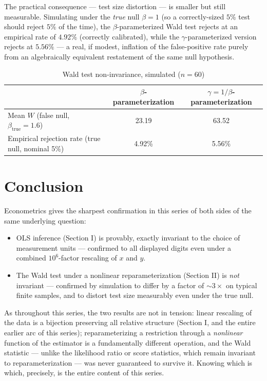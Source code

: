 \documentclass[10pt,journal,compsoc]{IEEEtran}
\begin{document}
The practical consequence — test size distortion — is smaller but still measurable. Simulating under the \emph{true} null $\beta=1$ (so a correctly-sized $5\%$ test should reject $5\%$ of the time), the $\beta$-parameterized Wald test rejects at an empirical rate of $4.92\%$ (correctly calibrated), while the $\gamma$-parameterized version rejects at $5.56\%$ — a real, if modest, inflation of the false-positive rate purely from an algebraically equivalent restatement of the same null hypothesis.

\begin{table}[h]
\centering
\caption{Wald test non-invariance, simulated ($n=60$)}
\begin{tabular}{lcc}
\toprule
& $\beta$-parameterization & $\gamma=1/\beta$-parameterization \\
\midrule
Mean $W$ (false null, $\beta_{\text{true}}=1.6$) & 23.19 & 63.52 \\
Empirical rejection rate (true null, nominal 5\%) & 4.92\% & 5.56\% \\
\bottomrule
\end{tabular}
\end{table}

\section{Conclusion}
Econometrics gives the sharpest confirmation in this series of both sides of the same underlying question:
\begin{itemize}
    \item OLS inference (Section I) is provably, exactly invariant to the choice of measurement units — confirmed to all displayed digits even under a combined $10^6$-factor rescaling of $x$ and $y$.
    \item The Wald test under a nonlinear reparameterization (Section II) is \emph{not} invariant — confirmed by simulation to differ by a factor of $\sim\!3\times$ on typical finite samples, and to distort test size measurably even under the true null.
\end{itemize}
As throughout this series, the two results are not in tension: linear rescaling of the data is a bijection preserving all relative structure (Section I, and the entire earlier arc of this series); reparameterizing a restriction through a \emph{nonlinear} function of the estimator is a fundamentally different operation, and the Wald statistic — unlike the likelihood ratio or score statistics, which remain invariant to reparameterization — was never guaranteed to survive it. Knowing which is which, precisely, is the entire content of this series.
\end{document}
